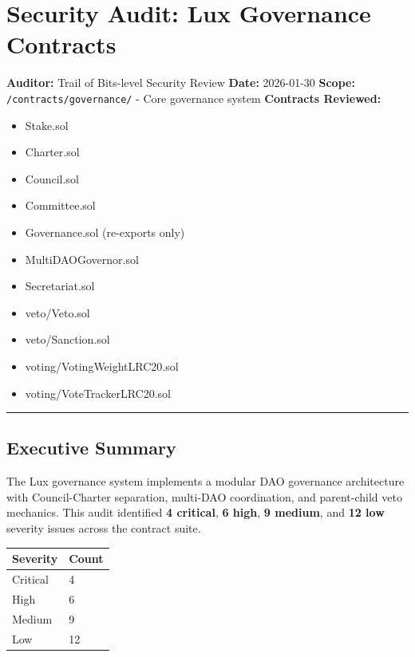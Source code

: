 \documentclass[
]{article}
\author{}
\date{}
\newcounter{none} %
\providecommand{\tightlist}{%
  \setlength{\itemsep}{0pt}\setlength{\parskip}{0pt}}
\begin{document}
\section{Security Audit: Lux Governance
Contracts}\label{security-audit-lux-governance-contracts}

\textbf{Auditor:} Trail of Bits-level Security Review \textbf{Date:}
2026-01-30 \textbf{Scope:} \texttt{/contracts/governance/} - Core
governance system \textbf{Contracts Reviewed:}

\begin{itemize}
\tightlist
\item
  Stake.sol
\item
  Charter.sol
\item
  Council.sol
\item
  Committee.sol
\item
  Governance.sol (re-exports only)
\item
  MultiDAOGovernor.sol
\item
  Secretariat.sol
\item
  veto/Veto.sol
\item
  veto/Sanction.sol
\item
  voting/VotingWeightLRC20.sol
\item
  voting/VoteTrackerLRC20.sol
\end{itemize}

\begin{center}\rule{0.5\linewidth}{0.5pt}\end{center}

\subsection{Executive Summary}\label{executive-summary}

The Lux governance system implements a modular DAO governance
architecture with Council-Charter separation, multi-DAO coordination,
and parent-child veto mechanics. This audit identified \textbf{4
critical}, \textbf{6 high}, \textbf{9 medium}, and \textbf{12 low}
severity issues across the contract suite.

{\def\LTcaptype{none} %
\begin{longtable}[]{@{}ll@{}}
\toprule\noalign{}
Severity & Count \\
\midrule\noalign{}
\endhead
\bottomrule\noalign{}
\endlastfoot
Critical & 4 \\
High & 6 \\
Medium & 9 \\
Low & 12 \\
\end{longtable}
}
\end{document}
